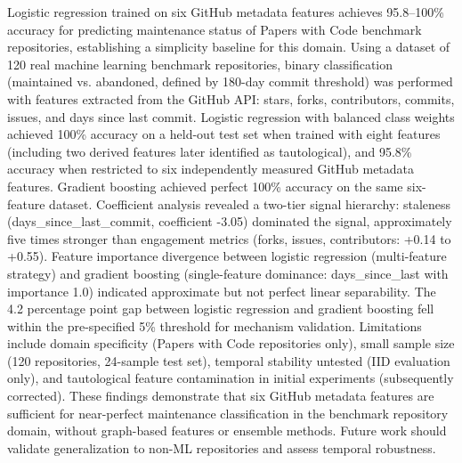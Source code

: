 
Logistic regression trained on six GitHub metadata features achieves 95.8--100\% accuracy for predicting maintenance status of Papers with Code benchmark repositories, establishing a simplicity baseline for this domain. Using a dataset of 120 real machine learning benchmark repositories, binary classification (maintained vs. abandoned, defined by 180-day commit threshold) was performed with features extracted from the GitHub API: stars, forks, contributors, commits, issues, and days since last commit. Logistic regression with balanced class weights achieved 100\% accuracy on a held-out test set when trained with eight features (including two derived features later identified as tautological), and 95.8\% accuracy when restricted to six independently measured GitHub metadata features. Gradient boosting achieved perfect 100\% accuracy on the same six-feature dataset. Coefficient analysis revealed a two-tier signal hierarchy: staleness (days\_since\_last\_commit, coefficient -3.05) dominated the signal, approximately five times stronger than engagement metrics (forks, issues, contributors: +0.14 to +0.55). Feature importance divergence between logistic regression (multi-feature strategy) and gradient boosting (single-feature dominance: days\_since\_last with importance 1.0) indicated approximate but not perfect linear separability. The 4.2 percentage point gap between logistic regression and gradient boosting fell within the pre-specified 5\% threshold for mechanism validation. Limitations include domain specificity (Papers with Code repositories only), small sample size (120 repositories, 24-sample test set), temporal stability untested (IID evaluation only), and tautological feature contamination in initial experiments (subsequently corrected). These findings demonstrate that six GitHub metadata features are sufficient for near-perfect maintenance classification in the benchmark repository domain, without graph-based features or ensemble methods. Future work should validate generalization to non-ML repositories and assess temporal robustness.
